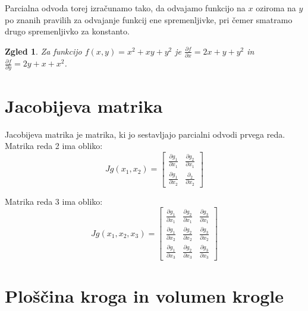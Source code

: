 \documentclass[12pt, a4paper]{article}
\newtheorem{zgled}{Zgled}
\begin{document}
Parcialna odvoda torej izračunamo tako, da odvajamo funkcijo na $x$ oziroma na $y$ po znanih pravilih za odvajanje funkcij ene spremenljivke, pri čemer smatramo drugo spremenljivko za konstanto.

\begin{zgled}

Za funkcijo $f(x, y)= x^2+xy+y^2$ je $\frac{\partial f}{\partial x}= 2x+y+y^2$ in $\frac{\partial f}{\partial y}= 2y+x+x^2$.

\end{zgled}

\section{Jacobijeva matrika}
Jacobijeva matrika je matrika, ki jo sestavljajo parcialni odvodi prvega reda.
Matrika reda 2 ima obliko:
$$
Jg(x_1,x_2)=
\begin{bmatrix}
\frac{\partial g_1}{\partial x_1} & \frac{\partial g_2}{\partial x_1}  \\
\frac{\partial g_1}{\partial x_2} & \frac{\partial _2}{\partial x_2} 
\end{bmatrix}
$$

\noindent Matrika reda 3 ima obliko:
$$
Jg(x_1,x_2,x_3)=
\begin{bmatrix}
\frac{\partial g_1}{\partial x_1}  & \frac{\partial g_2}{\partial x_1}  & \frac{\partial g_3}{\partial x_1}  \\
\frac{\partial g_1}{\partial x_2}  & \frac{\partial g_2}{\partial x_2}  & \frac{\partial g_3}{\partial x_2}  \\
\frac{\partial g_1}{\partial x_3}  & \frac{\partial g_2}{\partial x_3}  & \frac{\partial g_3}{\partial x_3} 
\end{bmatrix}
$$



\section{Ploščina kroga in volumen krogle}
\end{document}
